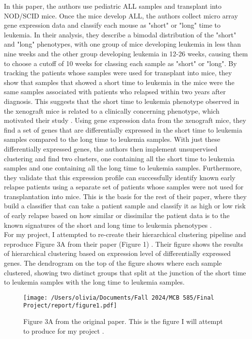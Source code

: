 \documentclass{article}
\begin{document}
In this paper, the authors use pediatric ALL samples and transplant into NOD/SCID mice. Once the mice develop ALL, the authors collect micro array gene expression data and classify each mouse as "short" or "long" time to leukemia. In their analysis, they describe a bimodal distribution of the "short" and "long" phenotypes, with one group of mice developing leukemia in less than nine weeks and the other group developing leukemia in 12-26 weeks, causing them to choose a cutoff of 10 weeks for classing each sample as "short" or "long". By tracking the patients whose samples were used for transplant into mice, they show that samples that showed a short time to leukemia in the mice were the same samples associated with patients who relapsed within two years after diagnosis. This suggests that the short time to leukemia phenotype observed in the xenograft mice is related to a clinically concerning phenotype, which motivated their study \cite{data}. Using gene expression data from the xenograft mice, they find a set of genes that are differentially expressed in the short time to leukemia samples compared to the long time to leukemia samples. With just these differentially expressed genes, the authors then implement unsupervised clustering and find two clusters, one containing all the short time to leukemia samples and one containing all the long time to leukemia samples. Furthermore, they validate that this expression profile can successfully identify known early relapse patients using a separate set of patients whose samples were not used for transplantation into mice. This is the basis for the rest of their paper, where they build a classifier that can take a patient sample and classify it as high or low risk of early relapse based on how similar or dissimilar the patient data is to the known signatures of the short and long time to leukemia phenotypes \cite{data}. 
\\

For my project, I attempted to re-create their hierarchical clustering pipeline and reproduce Figure 3A from their paper (Figure 1) \cite{data}. Their figure shows the results of hierarchical clustering based on expression level of differentially expressed genes. The dendrogram on the top of the figure shows where each sample clustered, showing two distinct groups that split at the junction of the short time to leukemia samples with the long time to leukemia samples. 

\begin{figure}[H]
    \centering
    \texttt{[image: /Users/olivia/Documents/Fall 2024/MCB 585/Final Project/report/figure1.pdf]}
    \caption{Figure 3A from the original paper. This is the figure I will attempt to produce for my project \cite{data}.}
    \label{fig:1}
\end{figure}
\end{document}
